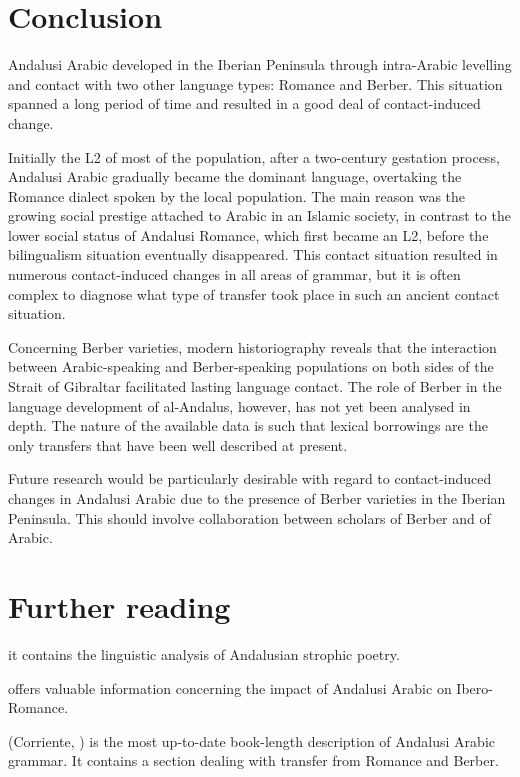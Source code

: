 \documentclass[output=paper,modfonts,nonflat]{langsci/langscibook}
\begin{document}
\section{Conclusion}


Andalusi Arabic developed in the Iberian Peninsula through intra-Arabic levelling and contact with two other language types: Romance and Berber. This situation spanned a long period of time and resulted in a good deal of contact-induced change. 

Initially the L2 of most of the population, after a two-century gestation process, Andalusi Arabic gradually became the dominant language, overtaking the Romance dialect spoken by the local population. The main reason was the growing social prestige attached to Arabic in an Islamic society, in contrast to the lower social status of Andalusi Romance, which first became an L2, before the bilingualism situation eventually disappeared. This contact situation resulted in numerous contact-induced changes in all areas of grammar, but it is often complex to diagnose what type of transfer took place in such an ancient contact situation. 

Concerning Berber varieties, modern historiography reveals that the interaction between Arabic-speaking and Berber-speaking populations on both sides of the Strait of Gibraltar facilitated lasting language contact. The role of Berber in the language development of al-Andalus, however, has not yet been analysed in depth. The nature of the available data is such that lexical borrowings are the only transfers that have been well described at present. 

Future research would be particularly desirable with regard to contact-induced changes in Andalusi Arabic due to the presence of Berber varieties in the Iberian Peninsula. This should involve collaboration between scholars of Berber and of Arabic. 

\section*{Further reading}

\citep{Corriente1997a} it{ contains the linguistic analysis of Andalusian strophic poetry.}

 \citep{Corriente2005} offers valuable information concerning the impact of Andalusi Arabic on Ibero-Romance. 

(Corriente, \citealt{PereiraVicente2015}) is the most up-to-date book-length description of Andalusi Arabic grammar. It contains a section dealing with transfer from Romance and Berber. 
\end{document}

